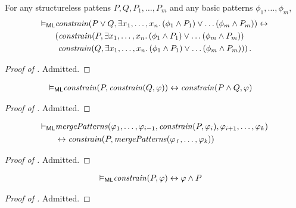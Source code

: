 \begin{lemma}\label{lem:constrain}
  For any structureless pattens $P, Q, P_1, \ldots, P_m$
  and any basic patterns $\phi_1, \ldots, \phi_m$,
    \begin{align*}
        \vDash_{\mathsf{ML}} & \mathit{constrain}(P \lor Q, \exists x_1,\ldots,x_{n}.\, (\phi_1 \land P_1) \lor \ldots (\phi_m \land P_{m})) \leftrightarrow
        \\ & ( \mathit{constrain}(P, \exists x_1,\ldots,x_{n}.\, (\phi_1 \land P_1) \lor \ldots (\phi_m \land P_{m}))
        \\ & \ \mathit{constrain}(Q, \exists x_1,\ldots,x_{n}.\, (\phi_1 \land P_1) \lor \ldots (\phi_m \land P_{m})) ) \, .
    \end{align*}
\end{lemma}
\begin{proof}[Proof of ]
Admitted.
\end{proof}

\begin{lemma}\label{lem:doubleconstrain}
    \begin{align*}
        \vDash_{\mathsf{ML}} & \mathit{constrain}(P , \mathit{constrain}(Q, \varphi))
        \leftrightarrow \mathit{constrain}(P \land Q, \varphi)
    \end{align*}
\end{lemma}
\begin{proof}[Proof of ]
Admitted.
\end{proof}

\begin{lemma}\label{lem:constrainMergeComm}
    \begin{align*}
        \vDash_{\mathsf{ML}} & \mathit{mergePatterns}(\varphi_1, \ldots, \varphi_{i-1}, \mathit{constrain}(P, \varphi_i), \varphi_{i+1}, \ldots, \varphi_k) \\
        & \leftrightarrow \mathit{constrain}(P, \mathit{mergePatterns(\varphi_1, \ldots, \varphi_k)})
    \end{align*}
\end{lemma}
\begin{proof}[Proof of ]
Admitted.
\end{proof}

\begin{lemma}\label{lem:constrainAsConjunction}
    \begin{align*}
        \vDash_{\mathsf{ML}} & \mathit{constrain}(P, \varphi) \leftrightarrow \varphi \land P
    \end{align*}
\end{lemma}
\begin{proof}[Proof of ]
Admitted.
\end{proof}


